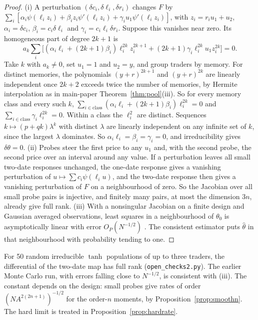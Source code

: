 \documentclass[12pt]{article}
\theoremstyle{definition}
\theoremstyle{remark}
\begin{document}
\begin{proof}
(i) A perturbation $(\delta c_i,\delta\ell_i,\delta r_i)$ changes $F$ by $\sum_i[\alpha_i\psi(\ell_iz_i)+\beta_iz_i\psi'(\ell_iz_i)+\gamma_iu_1\psi'(\ell_iz_i)]$, with $z_i=r_iu_1+u_2$, $\alpha_i=\delta c_i$, $\beta_i=c_i\delta\ell_i$ and $\gamma_i=c_i\ell_i\delta r_i$. Suppose this vanishes near zero. Its homogeneous part of degree $2k+1$ is
\[
a_k\sum_i\bigl[(\alpha_i\ell_i+(2k+1)\beta_i)\ell_i^{2k}z_i^{2k+1}+(2k+1)\gamma_i\ell_i^{2k}u_1z_i^{2k}\bigr]=0 .
\]
Take $k$ with $a_k\ne0$, set $u_1=1$ and $u_2=y$, and group traders by memory. For distinct memories, the polynomials $(y+r)^{2k+1}$ and $(y+r)^{2k}$ are linearly independent once $2k+2$ exceeds twice the number of memories, by Hermite interpolation as in main-paper Theorem~\ref{thm:pool}(iii). So for every memory class and every such $k$, $\sum_{i\in\text{class}}(\alpha_i\ell_i+(2k+1)\beta_i)\ell_i^{2k}=0$ and $\sum_{i\in\text{class}}\gamma_i\ell_i^{2k}=0$. Within a class the $\ell_i^2$ are distinct. Sequences $k\mapsto(p+qk)\lambda^k$ with distinct $\lambda$ are linearly independent on any infinite set of $k$, since the largest $\lambda$ dominates. So $\alpha_i\ell_i=\beta_i=\gamma_i=0$, and irreducibility gives $\delta\theta=0$.
(ii) Probes steer the first price to any $u_1$ and, with the second probe, the second price over an interval around any value. If a perturbation leaves all small two-date responses unchanged, the one-date response gives a vanishing perturbation of $u\mapsto\sum c_i\psi(\ell_iu)$, and the two-date response then gives a vanishing perturbation of $F$ on a neighbourhood of zero. So the Jacobian over all small probe pairs is injective, and finitely many pairs, at most the dimension $3n$, already give full rank.
(iii) With a nonsingular Jacobian on a finite design and Gaussian averaged observations, least squares in a neighbourhood of $\theta_0$ is asymptotically linear with error $O_P(N^{-1/2})$ \citep{vandervaart1998}. The consistent estimator puts $\hat\theta$ in that neighbourhood with probability tending to one.
\end{proof}

For 50 random irreducible $\tanh$ populations of up to three traders, the differential of the two-date map has full rank (\nolinkurl{open_checks2.py}). The earlier Monte Carlo run, with errors falling close to $N^{-1/2}$, is consistent with (iii). The constant depends on the design: small probes give rates of order $(NA^{2(2n+1)})^{-1/2}$ for the order-$n$ moments, by Proposition~\ref{prop:smoothn}. The hard limit is treated in Proposition~\ref{prop:hardrate}.
\end{document}
